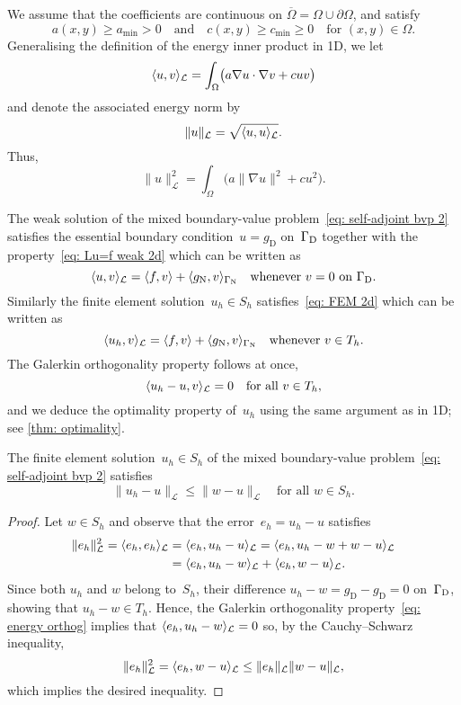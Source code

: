 We assume that the coefficients are continuous on
$\overline{\Omega}=\Omega\cup\partial\Omega$, and satisfy
\[
a(x,y)\ge a_{\min}>0\quad\text{and}\quad c(x,y)\ge c_{\min}\ge0
    \quad\text{for $(x,y)\in\Omega$.}
\]
Generalising the definition of the energy inner product in 1D, we let
\[
\langle u,v\rangle_{\mathcal{L}}=\int_\Omega\bigl(a\nabla u\cdot\nabla v
    +cuv\bigr)
\]
and denote the associated energy norm by
\[
\|u\|_{\mathcal{L}}=\sqrt{\langle u,u\rangle_{\mathcal{L}}}.
\]
Thus,
\[
\|u\|_{\mathcal{L}}^2=\int_\Omega\bigl(a\|\nabla u\|^2+cu^2\bigr).
\]

The weak solution of the mixed boundary-value 
problem~\eqref{eq: self-adjoint bvp 2} satisfies the 
essential boundary condition~$u=g_{\mathrm{D}}$ on~$\Gamma_{\mathrm{D}}$ together with the
property~\eqref{eq: Lu=f weak 2d} which can be written as
\[
\langle u,v\rangle_{\mathcal{L}}=\langle f,v\rangle+\langle g_{\mathrm{N}},v\rangle_{\Gamma_{\mathrm{N}}}
\quad\text{whenever $v=0$ on $\Gamma_{\mathrm{D}}$.}
\]
Similarly the finite element solution~$u_h\in S_h$ satisfies~\eqref{eq: FEM 2d} 
which can be written as
\[
\langle u_h,v\rangle_{\mathcal{L}}=\langle f,v\rangle+\langle g_{\mathrm{N}},v\rangle_{\Gamma_{\mathrm{N}}}
\quad\text{whenever $v\in T_h$.}
\]
The Galerkin orthogonality property follows at once,
\[
\langle u_h-u,v\rangle_{\mathcal{L}}=0\quad\text{for all $v\in T_h$,}
\]
and we deduce the optimality property of~$u_h$ using the same argument as in 
1D; see \cref{thm: optimality}.

\begin{theorem}\label{thm: optimality 2D}
The finite element solution~$u_h\in S_h$ of the mixed boundary-value 
problem~\eqref{eq: self-adjoint bvp 2} satisfies
\[
\|u_h-u\|_{\mathcal{L}}\le\|w-u\|_{\mathcal{L}}
	\quad\text{for all $w\in S_h$.}
\]
\end{theorem}
\begin{proof}
Let $w\in S_h$ and observe that the error~$e_h=u_h-u$ satisfies
\begin{align*}
\|e_h\|_{\mathcal{L}}^2=\langle e_h,e_h\rangle_{\mathcal{L}}
	&=\langle e_h,u_h-u\rangle_{\mathcal{L}}
	=\langle e_h,u_h-w+w-u\rangle_{\mathcal{L}}\\
	&=\langle e_h,u_h-w\rangle_{\mathcal{L}}+\langle e_h,w-u\rangle_{\mathcal{L}}.
\end{align*}
Since both $u_h$ and $w$ belong to~$S_h$, 
their difference $u_h-w=g_{\mathrm{D}}-g_{\mathrm{D}}=0$ on~$\Gamma_{\mathrm{D}}$, showing
that $u_h-w\in T_h$.  Hence, the Galerkin orthogonality 
property~\eqref{eq: energy orthog} implies
that $\langle e_h,u_h-w\rangle_{\mathcal{L}}=0$ so, by the Cauchy--Schwarz inequality,
\[
\|e_h\|_{\mathcal{L}}^2=\langle e_h,w-u\rangle_{\mathcal{L}}
	\le\|e_h\|_{\mathcal{L}}\|w-u\|_{\mathcal{L}},
\]
which implies the desired inequality.
\end{proof}



